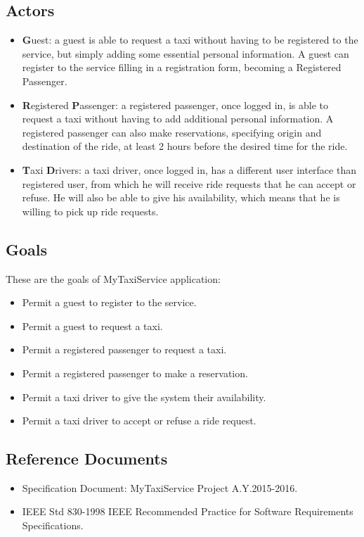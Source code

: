 \subsection{Actors}
\begin{itemize}
	\item \textbf{G}uest: a guest is able to request a taxi without having to be registered to the service, but simply adding some essential personal information. A guest can register to the service filling in a registration form, becoming a Registered Passenger.
	\item \textbf{R}egistered \textbf{P}assenger: a registered passenger, once logged in, is able to request a taxi without having to add additional personal information. A registered passenger can also make reservations, specifying origin and destination of the ride, at least 2 hours before the desired time for the ride.
	\item \textbf{T}axi \textbf{D}rivers: a taxi driver, once logged in, has a different user interface than registered user, from which he will receive ride requests that he can accept or refuse. He will also be able to give his availability, which means that he is willing to pick up ride requests.
\end{itemize}
\subsection{Goals}
These are the goals of MyTaxiService application:
\begin{itemize}
	\item Permit a guest to register to the service.
	\item Permit a guest to request a taxi.
	\item Permit a registered passenger to request a taxi.
	\item Permit a registered passenger to make a reservation.
	\item Permit a taxi driver to give the system their availability.
	\item Permit a taxi driver to accept or refuse a ride request.
\end{itemize}
\subsection{Reference Documents}
\begin{itemize}
	\item Specification Document: MyTaxiService Project A.Y.2015-2016.
	\item IEEE Std 830-1998 IEEE Recommended Practice for Software Requirements Specifications.
\end{itemize}

